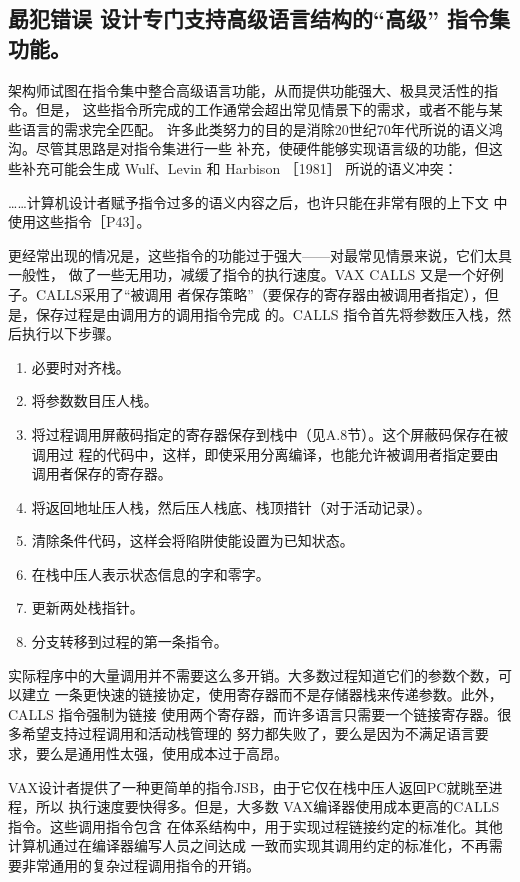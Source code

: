 \subsection{勗犯错误 设计专门支持高级语言结构的“高级” 指令集功能。}
架构师试图在指令集中整合高级语言功能，从而提供功能强大、极具灵活性的指令。但是，
这些指令所完成的工作通常会超出常见情景下的需求，或者不能与某些语言的需求完全匹配。
许多此类努力的目的是消除20世纪70年代所说的语义鸿沟。尽管其思路是对指令集进行一些
补充，使硬件能够实现语言级的功能，但这些补充可能会生成 Wulf、Levin 和 Harbison ［1981］
所说的语义冲突：

……计算机设计者赋予指令过多的语义内容之后，也许只能在非常有限的上下文
中使用这些指令［P43］。

更经常出现的情况是，这些指令的功能过于强大——对最常见情景来说，它们太具一般性，
做了一些无用功，减缓了指令的执行速度。VAX CALLS 又是一个好例子。CALLS采用了“被调用
者保存策略”（要保存的寄存器由被调用者指定），但是，保存过程是由调用方的调用指令完成
的。CALLS 指令首先将参数压入栈，然后执行以下步骤。

\begin{enumerate}
    \item 必要时对齐栈。
    \item 将参数数目压人栈。
    \item 将过程调用屏蔽码指定的寄存器保存到栈中（见A.8节）。这个屏蔽码保存在被调用过
    程的代码中，这样，即使采用分离编译，也能允许被调用者指定要由调用者保存的寄存器。
    \item 将返回地址压人栈，然后压人栈底、栈顶措针（对于活动记录）。
    \item 清除条件代码，这样会将陷阱使能设置为已知状态。
    \item 在栈中压人表示状态信息的字和零字。
    \item 更新两处栈指针。
    \item 分支转移到过程的第一条指令。
\end{enumerate}
实际程序中的大量调用并不需要这么多开销。大多数过程知道它们的参数个数，可以建立
一条更快速的链接协定，使用寄存器而不是存储器栈来传递参数。此外，CALLS 指令强制为链接
使用两个寄存器，而许多语言只需要一个链接寄存器。很多希望支持过程调用和活动栈管理的
努力都失败了，要么是因为不满足语言要求，要么是通用性太强，使用成本过于高昂。

VAX设计者提供了一种更简单的指令JSB，由于它仅在栈中压人返回PC就眺至进程，所以
执行速度要快得多。但是，大多数 VAX编译器使用成本更高的CALLS指令。这些调用指令包含
在体系结构中，用于实现过程链接约定的标准化。其他计算机通过在编译器编写人员之间达成
一致而实现其调用约定的标准化，不再需要非常通用的复杂过程调用指令的开销。

